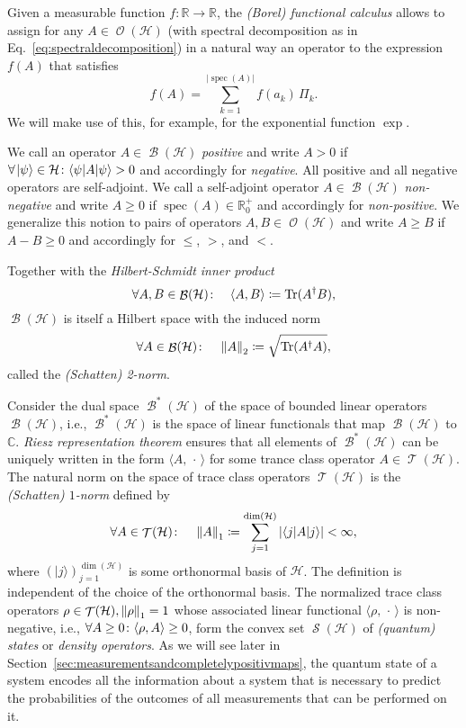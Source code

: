 \documentclass[a4paper,12pt,listof=totoc,index=totoc,bibliography=totoc,headsepline=false,headings=normal,BCOR16.153846mm,DIV12,headinclude,twoside,cleardoublepage=empty,numbers=noenddot,final]{scrreprt}
\theoremstyle{mystyle}
\numberwithin{equation}{section}
\numberwithin{figure}{section}
\numberwithin{lemma}{section}
\numberwithin{theorem}{section}
\numberwithin{corollary}{section}
\numberwithin{definition}{section}
\numberwithin{conjecture}{section}
\numberwithin{observation}{section}
\newcommand{\+}{\mkern2mu}
\newcommand{\coloneqq}{\mathrel{\vcentcolon\mkern-1.2mu=}} %
\newcommand{\texteqref}[1]{Eq.~\eqref{#1}}
\newcommand{\argdot}{{\,\cdot\,}}
\newcommand{\oftype}{\colon}
\newcommand{\itholds}{\colon\mathchoice{\quad}{}{}{}}
\newcommand{\bra}[1]{\langle #1|}
\newcommand{\ket}[1]{|#1\rangle}
\newcommand{\norm}[2][]{
  \ifthenelse{\equal{#1}{}}
    {\left\| {#2} \right\|}
    {\ifthenelse{\equal{#1}{uinv}}
      {\left\vert\kern-0.25ex\left\vert\kern-0.25ex\left\vert {#2} \right\vert\kern-0.25ex\right\vert\kern-0.25ex\right\vert}
      {\left\| {#2} \right\|_{#1}}
    }
}
\newcommand{\ad}{^\dagger}
\DeclareMathOperator{\1}{\mathds{1}}
\DeclareMathOperator{\Bop}{\mathcal{B}}
\DeclareMathOperator{\Tcl}{\mathcal{T}}
\DeclareMathOperator{\Obs}{\mathcal{O}}
\DeclareMathOperator{\Qst}{\mathcal{S}}
\DeclareMathOperator{\Tr}{Tr}
\DeclareMathOperator{\spec}{spec}
\newcommand{\mc}[1]{\mathcal{#1}}
\newcommand{\mcH}{\mc{H}}
\newcommand{\mb}[1]{\mathbb{#1}}
\newcommand{\R}{\mb{R}}
\renewcommand{\C}{\mb{C}} %
\begin{document}
Given a measurable function $f\oftype\R\to\R$, the \emph{(Borel) functional calculus} allows to assign for any $A \in \Obs(\mcH)$ (with spectral decomposition as in \texteqref{eq:spectraldecomposition}) in a natural way an operator to the expression $f(A)$ that satisfies
\begin{equation}
  f(A) = \sum_{k=1}^{|\spec(A)|} f(a_k)\,\Pi_k .
\end{equation}
We will make use of this, for example, for the exponential function $\exp$.

We call an operator $A \in \Bop(\mcH)$ \emph{positive} and write $A>0$ if $\forall\+\ket\psi\in\mcH\itholds\bra \psi A \ket \psi > 0$ and accordingly for \emph{negative}.
All positive and all negative operators are self-adjoint.
We call a self-adjoint operator $A \in \Bop(\mcH)$ \emph{non-negative} and write $A\geq0$ if $\spec(A) \in \R_0^+$ and accordingly for \emph{non-positive}.
We generalize this notion to pairs of operators $A,B\in\Obs(\mcH)$ and write $A \geq B$ if $A-B \geq 0$ and accordingly for $\leq$, $>$, and $<$.

Together with the \emph{Hilbert-Schmidt inner product}
\begin{equation}
  \forall A,B \in \Bop(\mcH)\itholds \langle A,B\rangle \coloneqq \Tr(A\ad B),
\end{equation}
$\Bop(\mcH)$ is itself a Hilbert space with the induced norm
\begin{equation} \label{eq:twonorm}
  \forall A \in \Bop(\mcH)\itholds \norm[2]A \coloneqq \sqrt{\Tr(A\ad A)} ,
\end{equation}
called the \emph{(Schatten) 2-norm}.

Consider the dual space $\Bop^*(\mcH)$ of the space of bounded linear operators $\Bop(\mcH)$, i.e., $\Bop^*(\mcH)$ is the space of linear functionals that map $\Bop(\mcH)$ to $\C$.
\emph{Riesz representation theorem} ensures that all elements of $\Bop^*(\mcH)$ can be uniquely written in the form $\langle A,\argdot\rangle$ for some trance class operator $A \in \Tcl(\mcH)$.
The natural norm on the space of trace class operators $\Tcl(\mcH)$ is the \emph{(Schatten) $1$-norm} defined by
\begin{equation} \label{eq:onenorm}
  \forall A \in \Tcl(\mcH) \itholds \norm[1]A \coloneqq \sum_{j=1}^{\dim(\mcH)} | \bra j A \ket j | < \infty ,
\end{equation}
where $(\ket j)_{j=1}^{\dim(\mcH)}$ is some orthonormal basis of $\mcH$.
The definition is independent of the choice of the orthonormal basis.
The normalized trace class operators $\rho \in \Tcl(\mcH), \norm[1]\rho = 1$ whose associated linear functional $\langle \rho,\argdot\rangle$ is non-negative, i.e., $\forall A \geq 0\itholds \langle \rho,A\rangle \geq 0$, form the convex set $\Qst(\mcH)$ of \emph{(quantum) states} or \emph{density operators}.
As we will see later in Section~\ref{sec:measurementsandcompletelypositivmaps}, the quantum state of a system encodes all the information about a system that is necessary to predict the probabilities of the outcomes of all measurements that can be performed on it.
\end{document}

